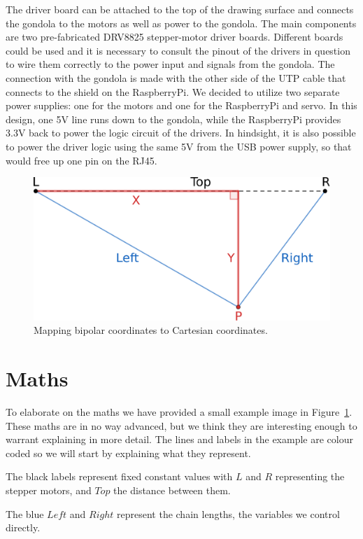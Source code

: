 \documentclass[a4paper,10pt]{article}
\begin{document}
The driver board can be attached to the top of the drawing surface and connects the gondola to the motors as well as power to the gondola. The main components are two pre-fabricated DRV8825 stepper-motor driver boards. Different boards could be used and it is necessary to consult the pinout of the drivers in question to wire them correctly to the power input and signals from the gondola. The connection with the gondola is made with the other side of the UTP cable that connects to the shield on the RaspberryPi. We decided to utilize two separate power supplies: one for the motors and one for the RaspberryPi and servo. In this design, one 5V line runs down to the gondola, while the RaspberryPi provides 3.3V back to power the logic circuit of the drivers. In hindsight, it is also possible to power the driver logic using the same 5V from the USB power supply, so that would free up one pin on the RJ45.



\clearpage
\begin{figure}[t]
  \centering
  \includegraphics[width=.45\textwidth]{img/drowbot-maths.eps}
  \caption{Mapping bipolar coordinates to Cartesian coordinates.}
  \label{fig:maths}
\end{figure}
\section{Maths}
\label{sec:maths}

To elaborate on the maths we have provided a small example image
in Figure~\ref{fig:maths}.
These maths are in no way advanced, but we think they are interesting
enough to warrant explaining in more detail.
The lines and labels in the example are colour coded so we will start
by explaining what they represent.

The black labels represent fixed constant values with $L$ and $R$
representing the stepper motors, and $Top$ the distance between them.

The blue $Left$ and $Right$ represent the chain lengths, the variables
we control directly.
\end{document}
